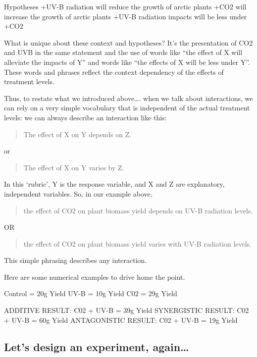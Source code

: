\documentclass[
]{book}
\begin{document}
Hypotheses
+UV-B radiation will reduce the growth of arctic plants
+CO2 will increase the growth of arctic plants
+UV-B radiation impacts will be less under +CO2

What is unique about these context and hypotheses? It's the presentation of CO2 and UVB in the same statement and the use of words like ``the effect of X will alleviate the impacts of Y'' and words like ``the effects of X will be less under Y''. These words and phrases reflect the context dependency of the effects of treatment levels.

Thus, to restate what we introduced above\ldots. when we talk about interactions, we can rely on a very simple vocabulary that is independent of the actual treatment levels: we can always describe an interaction like this:

\begin{quote}
The effect of X on Y depends on Z.
\end{quote}

or

\begin{quote}
The effect of X on Y varies by Z.
\end{quote}

In this `rubric', Y is the response variable, and X and Z are explanatory, independent variables. So, in our example above,

\begin{quote}
the effect of CO2 on plant biomass yield depends on UV-B radiation levels.
\end{quote}

OR

\begin{quote}
the effect of CO2 on plant biomass yield varies with UV-B radiation levels.
\end{quote}

This simple phrasing describes any interaction.

Here are some numerical examples to drive home the point.

Control = 20g Yield
UV-B = 10g Yield
C02 = 29g Yield

ADDITIVE RESULT: C02 + UV-B = 39g Yield
SYNERGISTIC RESULT: C02 + UV-B = 60g Yield
ANTAGONISTIC RESULT: C02 + UV-B = 19g Yield

\hypertarget{lets-design-an-experiment-again}{%
\subsection{Let's design an experiment, again\ldots{}}\label{lets-design-an-experiment-again}}
\end{document}
